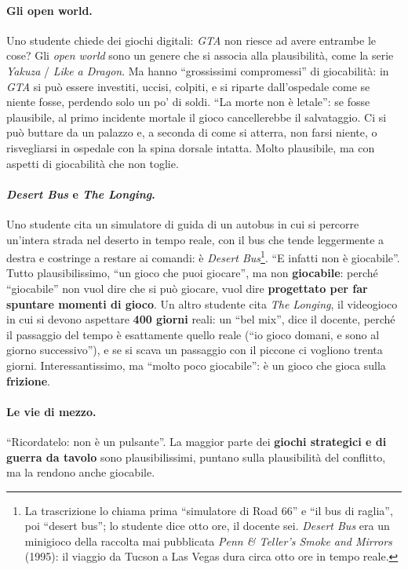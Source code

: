\paragraph{Gli open world.} Uno studente chiede dei giochi digitali: \emph{GTA}
non riesce ad avere entrambe le cose? Gli \emph{open world} sono un genere che si
associa alla plausibilità, come la serie \emph{Yakuza} / \emph{Like a Dragon}.
Ma hanno ``grossissimi compromessi'' di giocabilità: in \emph{GTA} si può essere
investiti, uccisi, colpiti, e si riparte dall'ospedale come se niente fosse,
perdendo solo un po' di soldi. ``La morte non è letale'': se fosse plausibile, al
primo incidente mortale il gioco cancellerebbe il salvataggio. Ci si può buttare
da un palazzo e, a seconda di come si atterra, non farsi niente, o risvegliarsi
in ospedale con la spina dorsale intatta. Molto plausibile, ma con aspetti di
giocabilità che non toglie.

\paragraph{\emph{Desert Bus} e \emph{The Longing}.} Uno studente cita un
simulatore di guida di un autobus in cui si percorre un'intera strada nel deserto
in tempo reale, con il bus che tende leggermente a destra e costringe a restare
ai comandi: è \emph{Desert Bus}\footnote{La trascrizione lo chiama prima
``simulatore di Road 66'' e ``il bus di raglia'', poi ``desert bus''; lo
studente dice otto ore, il docente sei. \emph{Desert Bus} era un minigioco della
raccolta mai pubblicata \emph{Penn \& Teller's Smoke and Mirrors} (1995): il
viaggio da Tucson a Las Vegas dura circa otto ore in tempo reale.}. ``E infatti
non è giocabile''. Tutto plausibilissimo, ``un gioco che puoi giocare'', ma non
\textbf{giocabile}: perché ``giocabile'' non vuol dire che si può giocare, vuol
dire \textbf{progettato per far spuntare momenti di gioco}. Un altro studente
cita \emph{The Longing}, il videogioco in cui si devono aspettare
\textbf{400 giorni} reali: un ``bel mix'', dice il docente, perché il passaggio
del tempo è esattamente quello reale (``io gioco domani, e sono al giorno
successivo''), e se si scava un passaggio con il piccone ci vogliono trenta
giorni. Interessantissimo, ma ``molto poco giocabile'': è un gioco che gioca
sulla \textbf{frizione}.

\paragraph{Le vie di mezzo.} ``Ricordatelo: non è un pulsante''. La maggior parte
dei \textbf{giochi strategici e di guerra da tavolo} sono plausibilissimi, puntano
sulla plausibilità del conflitto, ma la rendono anche giocabile.

